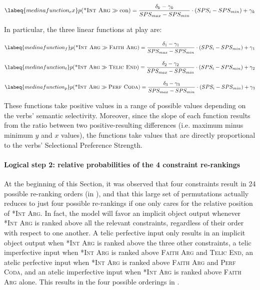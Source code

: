 \begin{equation} \labeq{medinafunction_ex}
p(\textsc{*Int Arg} \gg \textrm{con}) = \frac{\delta_k - \gamma_k}{SPS_{max} - SPS_{min}} \cdot ({SPS_{i} - SPS_{min}}) + \gamma_k
\end{equation}

In particular, the three linear functions at play are:

\begin{equation} \labeq{medinafunction_f}
p(\textsc{*Int Arg} \gg \textsc{Faith Arg}) = \frac{\delta_1 - \gamma_1}{SPS_{max} - SPS_{min}} \cdot ({SPS_{i} - SPS_{min}}) + \gamma_1
\end{equation}

\begin{equation} \labeq{medinafunction_t}
p(\textsc{*Int Arg} \gg \textsc{Telic End}) = \frac{\delta_2 - \gamma_2}{SPS_{max} - SPS_{min}} \cdot ({SPS_{i} - SPS_{min}}) + \gamma_2
\end{equation}

\begin{equation} \labeq{medinafunction_p}
p(\textsc{*Int Arg} \gg \textsc{Perf Coda}) = \frac{\delta_3 - \gamma_3}{SPS_{max} - SPS_{min}} \cdot ({SPS_{i} - SPS_{min}}) + \gamma_3
\end{equation}

These functions take positive values in a range of possible values depending on the verbs' semantic selectivity. Moreover, since the slope of each function results from the ratio between two positive-resulting differences (i.e. maximum minus minimum $y$ and $x$ values), the functions take values that are directly proportional to the verbs' Selectional Preference Strength.

\paragraph{Logical step 2: relative probabilities of the 4 constraint re-rankings} At the beginning of this Section, it was observed that four constraints result in 24 possible re-ranking orders (in ), and that this large set of permutations actually reduces to just four possible re-rankings if one only cares for the relative position of \textsc{*Int Arg}. In fact, the model will favor an implicit object output whenever \textsc{*Int Arg} is ranked above all the relevant constraints, regardless of their order with respect to one another. A telic perfective input only results in an implicit object output when \textsc{*Int Arg} is ranked above the three other constraints, a telic imperfective input when \textsc{*Int Arg} is ranked above \textsc{Faith Arg} and \textsc{Telic End}, an atelic perfective input when \textsc{*Int Arg} is ranked above \textsc{Faith Arg} and \textsc{Perf Coda}, and an atelic imperfective input when \textsc{*Int Arg} is ranked above \textsc{Faith Arg} alone. This results in the four possible orderings in .

